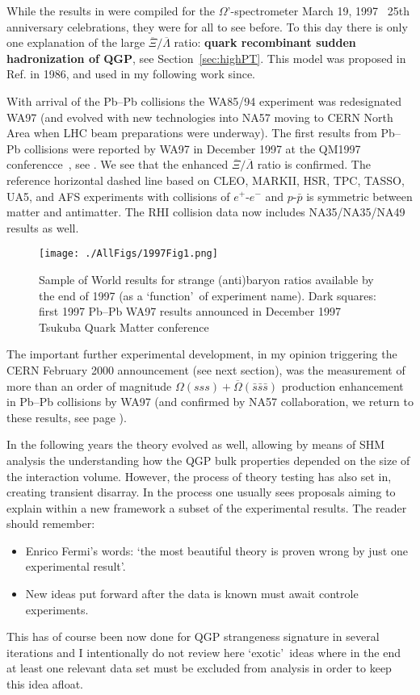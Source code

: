 While the results in  were compiled for the $\Omega$\rq-spectro\-meter March 19, 1997~\cite{Omega25y} 25th anniversary celebrations, they were for all to see before. To this day there is only one explanation of the large $\overline{\Xi}/\overline{\Lambda}$ ratio: {\bf quark recombinant sudden hadronization of QGP}, see Section~\ref{sec:highPT}. This model was proposed in Ref.\cite{Koch:1986ud} in 1986, and used in my following work since.

With arrival of the Pb--Pb collisions the WA85/94 experiment was redesignated WA97 (and evolved with new technologies into NA57 moving to CERN North Area when LHC beam preparations were underway). The first results from Pb--Pb collisions were reported by WA97 in December 1997 at the QM1997 conferencce~\cite{QM97}, see . We see that the enhanced $\overline{\Xi}/\overline{\Lambda}$ ratio is confirmed. The reference horizontal dashed line based on CLEO, MARKII, HSR, TPC, TASSO, UA5, and AFS experiments with collisions of $e^+$-$e^-$ and $p$-$\bar p$ is symmetric between matter and antimatter. The RHI collision data now includes NA35/NA35/NA49 results as well.

\begin{figure}[tb]\sidecaption
\texttt{[image: ./AllFigs/1997Fig1.png]}
\caption{
Sample of World results for strange (anti)baryon ratios available by the end of 1997 (as a \lq function\rq\ of experiment name). Dark squares: first 1997 Pb--Pb WA97 results announced in December 1997 Tsukuba Quark Matter conference~\cite{QM97} \label{RSS}
}
\end{figure}

The important further experimental development, in my opinion triggering the CERN February 2000 announcement (see next section), was the measurement of more than an order of magnitude $\Omega(sss)+\overline\Omega(\bar s\bar s\bar s)$ production enhancement in Pb--Pb collisions by WA97 (and confirmed by NA57 collaboration, we return to these results, see page \pageref{fig:NA57}). 

In the following years the theory evolved as well, allowing by means of SHM analysis the understanding how the QGP bulk properties depended on the size of the interaction volume. However, the process of theory testing has also set in, creating transient disarray. In the process one usually sees proposals aiming to explain within a new framework a subset of the experimental results. The reader should remember:
\begin{itemize}
\item
Enrico Fermi\rq s words: \lq the most beautiful theory is proven wrong by just one experimental result\rq.
\item 
New ideas put forward after the data is known must await controle experiments. 
\end{itemize}
This has of course been now done for QGP strangeness signature in several iterations and I intentionally do not review here \lq exotic\rq\ ideas where in the end at least one relevant data set must be excluded from analysis in order to keep this idea afloat. 

